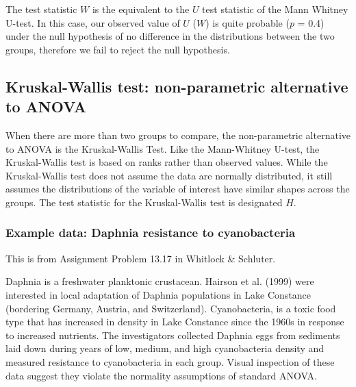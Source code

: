\documentclass[]{book}
\theoremstyle{definition}
\theoremstyle{definition}
\theoremstyle{definition}
\theoremstyle{remark}
\begin{document}
The test statistic \(W\) is the equivalent to the \(U\) test statistic
of the Mann Whitney U-test. In this case, our observed value of \(U\)
(\(W\)) is quite probable (\(p\) = 0.4) under the null hypothesis of no
difference in the distributions between the two groups, therefore we
fail to reject the null hypothesis.

\hypertarget{kruskal-wallis-test-non-parametric-alternative-to-anova}{%
\subsection{Kruskal-Wallis test: non-parametric alternative to
ANOVA}\label{kruskal-wallis-test-non-parametric-alternative-to-anova}}

When there are more than two groups to compare, the non-parametric
alternative to ANOVA is the Kruskal-Wallis Test. Like the Mann-Whitney
U-test, the Kruskal-Wallis test is based on ranks rather than observed
values. While the Kruskal-Wallis test does not assume the data are
normally distributed, it still assumes the distributions of the variable
of interest have similar shapes across the groups. The test statistic
for the Kruskal-Wallis test is designated \(H\).

\hypertarget{example-data-daphnia-resistance-to-cyanobacteria}{%
\subsubsection*{Example data: Daphnia resistance to
cyanobacteria}\label{example-data-daphnia-resistance-to-cyanobacteria}}

This is from Assignment Problem 13.17 in Whitlock \& Schluter.

Daphnia is a freshwater planktonic crustacean. Hairson et al. (1999)
were interested in local adaptation of Daphnia populations in Lake
Constance (bordering Germany, Austria, and Switzerland). Cyanobacteria,
is a toxic food type that has increased in density in Lake Constance
since the 1960s in response to increased nutrients. The investigators
collected Daphnia eggs from sediments laid down during years of low,
medium, and high cyanobacteria density and measured resistance to
cyanobacteria in each group. Visual inspection of these data suggest
they violate the normality assumptions of standard ANOVA.
\end{document}
